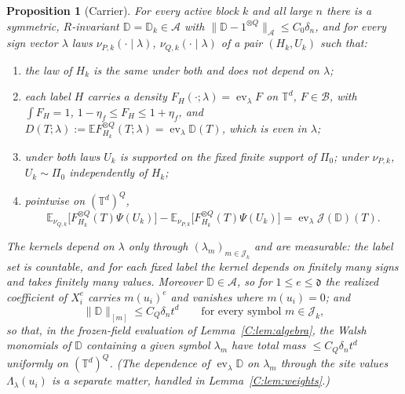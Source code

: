 \documentclass[11pt]{article}
\newtheorem{proposition}[proposition]{Proposition}
\DeclareMathOperator{\ev}{ev}
\newcommand{\E}{\mathbb{E}}
\newcommand{\Torus}{\mathbb{T}}
\newcommand{\cA}{\mathcal{A}}
\newcommand{\cB}{\mathcal{B}}
\newcommand{\cJ}{\mathcal{J}}
\newcommand{\norm}[1]{\lVert #1\rVert}
\newcommand{\dg}{\mathfrak{d}}
\begin{document}
\begin{proposition}[Carrier]\label{C:prop:carrier}
For every active block \(k\) and all large \(n\) there is a symmetric,
\(R\)-invariant \(\mathbb D=\mathbb D_k\in\cA\) with
\(\norm{\mathbb D-1^{\otimes Q}}_\cA\le C_0\delta_n\), and for every sign
vector \(\lambda\) laws \(\nu_{P,k}(\cdot\mid\lambda)\), \(\nu_{Q,k}(\cdot\mid\lambda)\)
of a pair \((H_k,U_k)\) such that:
\begin{enumerate}[label=(\roman*),leftmargin=*]
\item the law of \(H_k\) is the same under both and does not depend on
\(\lambda\);
\item each label \(H\) carries a density \(F_{H}(\cdot;\lambda)=\ev_\lambda F\) on
\(\Torus^d\), \(F\in\cB\), with \(\int F_H=1\), \(1-\eta_f\le F_H\le1+\eta_f\), and
\(D(T;\lambda):=\E F_{H_k}^{\otimes Q}(T;\lambda)=\ev_\lambda\mathbb D(T)\), which
is even in \(\lambda\);
\item under both laws \(U_k\) is supported on the fixed finite support of
\(\Pi_0\); under \(\nu_{P,k}\), \(U_k\sim\Pi_0\) independently of \(H_k\);
\item pointwise on \((\Torus^d)^Q\),
\begin{equation}
 \E_{\nu_{Q,k}}\bigl[F_{H_k}^{\otimes Q}(T)\Psi(U_k)\bigr]
 -\E_{\nu_{P,k}}\bigl[F_{H_k}^{\otimes Q}(T)\Psi(U_k)\bigr]
 =\ev_\lambda\cJ(\mathbb D)(T).
 \label{C:eq:master}
\end{equation}
\end{enumerate}
The kernels depend on \(\lambda\) only through \((\lambda_m)_{m\in\cJ_k}\)
and are measurable: the label set is countable, and for each fixed label
the kernel depends on finitely many signs and takes finitely many
values.  Moreover
\(\mathbb D\in\cA\), so for \(1\le e\le\dg\) the realized coefficient
of \(X_i^e\) carries \(m(u_i)^e\) and vanishes where \(m(u_i)=0\); and
\begin{equation}
 \norm{\mathbb D}_{[m]}\le C_Q\delta_nt^d\qquad\text{for every symbol }m\in\cJ_k ,
 \label{C:eq:D-symbol}
\end{equation}
so that, in the frozen-field evaluation of Lemma~\ref{C:lem:algebra},
the Walsh monomials of \(\mathbb D\) containing a given symbol
\(\lambda_m\) have total mass \(\le C_Q\delta_nt^d\) uniformly on
\((\Torus^d)^Q\).  (The dependence of \(\ev_\lambda\mathbb D\) on
\(\lambda_m\) through the site values \(\Lambda_\lambda(u_i)\) is a separate
matter, handled in Lemma~\ref{C:lem:weights}.)
\end{proposition}
\end{document}
